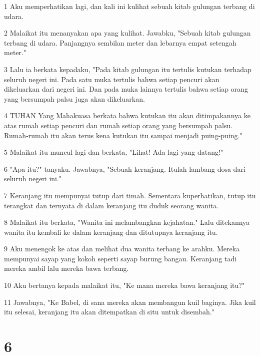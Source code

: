 \par 1 Aku memperhatikan lagi, dan kali ini kulihat sebuah kitab gulungan terbang di udara.
\par 2 Malaikat itu menanyakan apa yang kulihat. Jawabku, "Sebuah kitab gulungan terbang di udara. Panjangnya sembilan meter dan lebarnya empat setengah meter."
\par 3 Lalu ia berkata kepadaku, "Pada kitab gulungan itu tertulis kutukan terhadap seluruh negeri ini. Pada satu muka tertulis bahwa setiap pencuri akan dikeluarkan dari negeri ini. Dan pada muka lainnya tertulis bahwa setiap orang yang bersumpah palsu juga akan dikeluarkan.
\par 4 TUHAN Yang Mahakuasa berkata bahwa kutukan itu akan ditimpakannya ke atas rumah setiap pencuri dan rumah setiap orang yang bersumpah palsu. Rumah-rumah itu akan terus kena kutukan itu sampai menjadi puing-puing."
\par 5 Malaikat itu muncul lagi dan berkata, "Lihat! Ada lagi yang datang!"
\par 6 "Apa itu?" tanyaku. Jawabnya, "Sebuah keranjang. Itulah lambang dosa dari seluruh negeri ini."
\par 7 Keranjang itu mempunyai tutup dari timah. Sementara kuperhatikan, tutup itu terangkat dan ternyata di dalam keranjang itu duduk seorang wanita.
\par 8 Malaikat itu berkata, "Wanita ini melambangkan kejahatan." Lalu ditekannya wanita itu kembali ke dalam keranjang dan ditutupnya keranjang itu.
\par 9 Aku menengok ke atas dan melihat dua wanita terbang ke arahku. Mereka mempunyai sayap yang kokoh seperti sayap burung bangau. Keranjang tadi mereka ambil lalu mereka bawa terbang.
\par 10 Aku bertanya kepada malaikat itu, "Ke mana mereka bawa keranjang itu?"
\par 11 Jawabnya, "Ke Babel, di sana mereka akan membangun kuil baginya. Jika kuil itu selesai, keranjang itu akan ditempatkan di situ untuk disembah."

\chapter{6}

